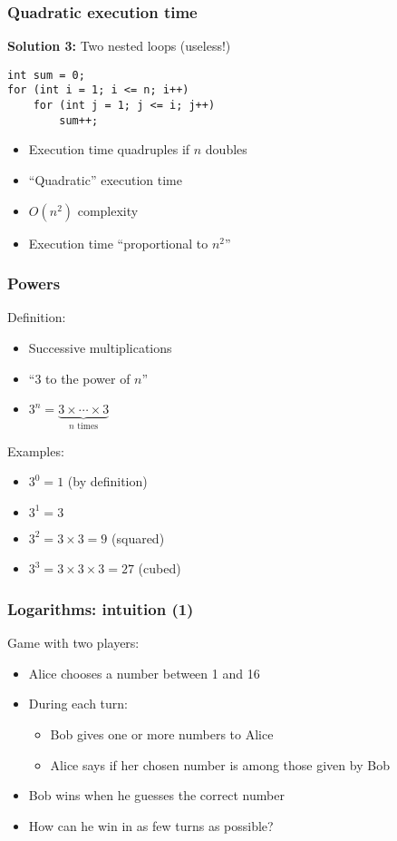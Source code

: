 \documentclass[12pt]{beamer}
\begin{document}
\begin{frame}[fragile]
\frametitle{Quadratic execution time}
\textbf{Solution 3:} Two nested loops (useless!)
\begin{lstlisting}
int sum = 0;
for (int i = 1; i <= n; i++)
    for (int j = 1; j <= i; j++)
        sum++;
\end{lstlisting}
\begin{itemize}
\item Execution time quadruples if $n$ doubles
\item ``Quadratic'' execution time
\item $O(n^2)$ complexity
\item Execution time ``proportional to $n^2$''
\end{itemize}
\end{frame}

\begin{frame}
\frametitle{Powers}
Definition:
\begin{itemize}
\item Successive multiplications
\item ``3 to the power of $n$''
\item $3^n = \underbrace{3\times\cdots\times3}_\text{$n$ times}$
\end{itemize}
Examples:
\begin{itemize}
\item $3^0 = 1$ (by definition)
\item $3^1 = 3$
\item $3^2 = 3 \times 3 = 9$ (squared)
\item $3^3 = 3 \times 3 \times 3 = 27$ (cubed)
\end{itemize}
\end{frame}

\begin{frame}
\frametitle{Logarithms: intuition (1)}
Game with two players:
\begin{itemize}
\item Alice chooses a number between 1 and 16
\item During each turn:
    \begin{itemize}
    \item Bob gives one or more numbers to Alice
    \item Alice says if her chosen number is among those given by Bob
    \end{itemize}
\item Bob wins when he guesses the correct number
\item How can he win in as few turns as possible?
\end{itemize}
\end{frame}
\end{document}
